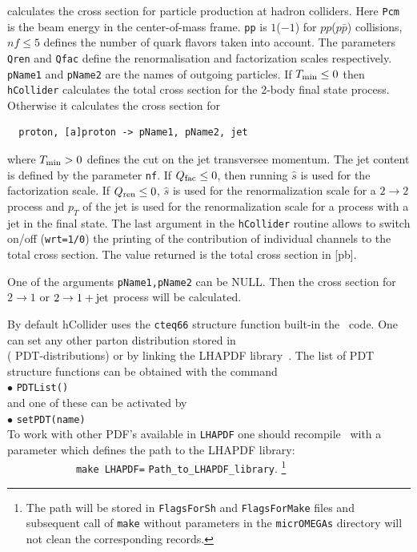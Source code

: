 \documentclass[12pt,a4paper]{article}
\begin{document}
calculates the cross
section for particle production at hadron colliders. Here \verb|Pcm| 
is the beam energy  in the center-of-mass frame. \verb|pp| is
$1$($-1$) for $pp$($p\bar{p}$) collisions, $ nf \le 5$  defines the
number of quark flavors taken into account.
The parameters  {\tt Qren} and  {\tt Qfac} define the renormalisation and factorization
 scales respectively. {\tt pName1} and {\tt pName2} are the names of outgoing
particles. If $T_{\rm min} \le 0 $ then {\tt hCollider} calculates the total  
cross section for the 2-body final state  process. Otherwise it calculates the cross
section for
\begin{verbatim}
  proton, [a]proton -> pName1, pName2, jet
\end{verbatim} 
where $ T_{\rm min}>0 $  defines the cut on the  jet transversee momentum. 
The jet content is defined by the  parameter \verb|nf|. 
If $Q_{\rm fac} \le 0 $, then  running  $\hat{s}$ is used for the
factorization  scale. If  $Q_{\rm ren} \le 0 $,  
$\hat{s}$ is used for the renormalization scale for a $2\to2$ process and $p_{T}$ of the jet is used for the renormalization scale for a process with a jet in the final state.
The last argument in the  {\tt hCollider} routine allows to switch
on/off ({\tt wrt=1/0}) the printing  of the contribution of individual channels to the total
cross section.   The value returned  is the total  cross section in [pb]. 


One of the arguments \verb|pName1,pName2| can be NULL. Then the cross section for $2\to1$   or $2\to1 + {\rm jet}$
process will be calculated. 

By default hCollider uses the 
\verb|cteq66| \cite{Nadolsky:2008zw}
structure function built-in
the \micro\ code. One can set any other parton distribution stored  in\\
   ( PDT-distributions) or by linking the  LHAPDF library~\cite{Buckley:2014ana}.  The list  of  PDT  structure functions  can be
obtained with the command \\
$\bullet$ \verb|PDTList()| \\
and one of these can be activated by\\ 
$\bullet$ \verb|setPDT(name)|\\

To work with other PDF's available in {\tt LHAPDF}  one should 
 recompile \micro\ with a parameter which defines the  path to the LHAPDF library:\\
\verb|            make LHAPDF=|
{\tt Path\_to\_LHAPDF\_library}. 
\footnote{ The path will be stored in {\tt FlagsForSh} and 
{\tt FlagsForMake} files and subsequent call of {\tt make} without parameters  in the {\tt micrOMEGAs} directory  will not clean the corresponding records.  } \\
\end{document}
